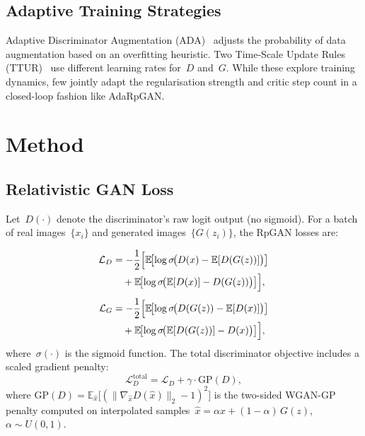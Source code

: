 \documentclass{article}
\begin{document}
\subsection{Adaptive Training Strategies}

Adaptive Discriminator Augmentation (ADA)~\cite{karras2020training} adjusts the probability of data augmentation based on an overfitting heuristic. Two Time-Scale Update Rules (TTUR)~\cite{heusel2017gans} use different learning rates for~$D$ and~$G$. While these explore training dynamics, few jointly adapt the regularisation strength and critic step count in a closed-loop fashion like AdaRpGAN.

\section{Method}
\label{sec:method}

\subsection{Relativistic GAN Loss}

Let~$D(\cdot)$ denote the discriminator's raw logit output (no sigmoid). For a batch of real images~$\{x_i\}$ and generated images~$\{G(z_i)\}$, the RpGAN losses are:

\vspace{-0.3em}
\begin{align}
\mathcal{L}_D &= -\frac{1}{2}\Bigl[
    \mathbb{E}\!\bigl[\log\sigma\!\bigl(D(x) - \mathbb{E}[D(G(z))]\bigr)\bigr] \notag\\
    &\quad + \mathbb{E}\!\bigl[\log\sigma\!\bigl(\mathbb{E}[D(x)] - D(G(z))\bigr)\bigr]
\Bigr], \label{eq:d_loss}\\[3pt]
\mathcal{L}_G &= -\frac{1}{2}\Bigl[
    \mathbb{E}\!\bigl[\log\sigma\!\bigl(D(G(z)) - \mathbb{E}[D(x)]\bigr)\bigr] \notag\\
    &\quad + \mathbb{E}\!\bigl[\log\sigma\!\bigl(\mathbb{E}[D(G(z))] - D(x)\bigr)\bigr]
\Bigr], \label{eq:g_loss}
\end{align}
where~$\sigma(\cdot)$ is the sigmoid function. The total discriminator objective includes a scaled gradient penalty:
\begin{equation}
    \mathcal{L}_{D}^{\mathrm{total}} = \mathcal{L}_D + \gamma \cdot \mathrm{GP}(D),
\label{eq:d_total}
\end{equation}
where $\mathrm{GP}(D) = \mathbb{E}_{\hat{x}}\!\bigl[(\|\nabla_{\hat{x}} D(\hat{x})\|_2 - 1)^2\bigr]$ is the two-sided WGAN-GP penalty computed on interpolated samples~$\hat{x} = \alpha x + (1{-}\alpha)\,G(z)$, $\alpha \sim U(0,1)$.
\end{document}
